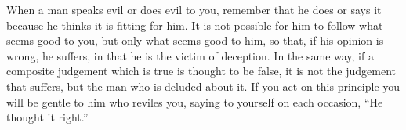 When a man  speaks evil or does evil  to you, remember that he does  or says it
because he thinks it  is fitting for him. It is not possible  for him to follow
what seems  good to  you, but  only what  seems good  to him,  so that,  if his
opinion is  wrong, he suffers, in  that he is  the victim of deception.  In the
same way, if a composite judgement which is  true is thought to be false, it is
not the judgement that suffers, but the man who is deluded about it. If you act
on this principle you will be gentle to him who reviles you, saying to yourself
on each occasion, ``He thought it right.''
